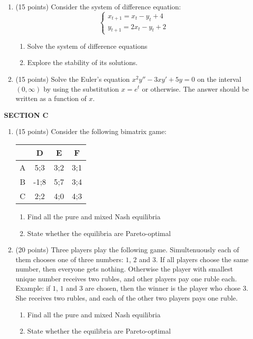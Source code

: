 \documentclass[12pt,a4paper]{article}
\begin{document}
\begin{enumerate}[resume]
\item (15 points)  Consider the system of difference equation:
\[
\begin{cases}
x_{t+1}=x_t-y_t+4 \\
y_{t+1}=2x_t-y_t+2
\end{cases}
\]

\begin{enumerate}
\item Solve the system of difference equations 
\item Explore the stability of its solutions.
\end{enumerate}

\item   (15 points)   Solve the  Euler’s equation $x^2y''-3xy'+5y=0$ on the interval $(0,\infty)$ by using the substitution $x=e^t$ or otherwise. The answer should be written as a function of $x$.

\end{enumerate}


\textbf{SECTION C}

\begin{enumerate}[resume]
\item  (15 points)   Consider the following bimatrix game:


\begin{tabular}{c|ccc}
 & D & E & F \\ 
\hline 
A & 5;3 & 3;2 & 3;1  \\ 
B & -1;8 & 5;7 & 3;4  \\ 
C & 2;2 & 4;0 & 4;3  \\ 
\end{tabular} 

\begin{enumerate}
\item Find all the pure and mixed Nash equilibria
\item State whether the equilibria are Pareto-optimal
\end{enumerate}

\item  (20 points)  Three players play the following game. Simultenuously each of them chooses one of three numbers: $1$, $2$ and $3$. If all players choose the same number, then everyone gets nothing. Otherwise the player with smallest unique number receives two rubles, and other players pay one ruble each. Example: if $1$, $1$ and $3$ are chosen, then the winner is the player who chose $3$. She receives two rubles, and  each of the other two players pays one ruble.
\begin{enumerate}
\item Find all the pure and mixed Nash equilibria
\item State whether the equilibria are Pareto-optimal
\end{enumerate}



\end{enumerate}
\end{document}
